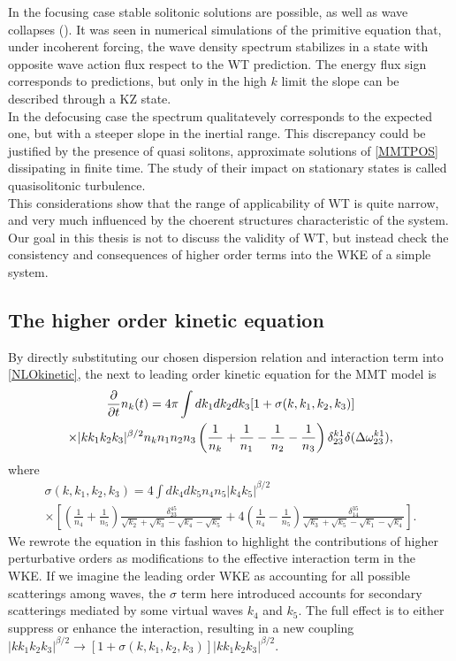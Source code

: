     In the focusing case stable solitonic solutions are possible, as well as wave collapses
    (\cite{Zakharov2001}). It was seen in numerical simulations of the primitive equation that, under incoherent forcing, the wave density spectrum stabilizes in a state
    with opposite wave action flux respect to the WT prediction. The energy flux sign corresponds to predictions, but only in the high $k$ limit the slope can be 
    described through a KZ state.\\
    In the defocusing case the spectrum qualitatevely corresponds to the expected one, but with a steeper slope in the inertial range. This discrepancy could be justified 
    by the presence of quasi solitons, approximate solutions of \eqref{MMTPOS} dissipating in finite time. The study of their impact on stationary states is called 
    quasisolitonic turbulence. \\
    This considerations show that the range of applicability of WT is quite narrow, and very much influenced by the choerent structures characteristic of the system. 
    Our goal in this thesis is not to discuss the validity of WT, but instead check the consistency and consequences of higher order terms into the 
    WKE of a simple system. \\
    \subsection{The higher order kinetic equation}

    By directly substituting our chosen dispersion relation and interaction term into \eqref{NLOkinetic}, the next to leading order kinetic equation for the MMT 
    model is 
    \begin{multline}
        \frac{\partial}{\partial t}n_k(t) = 4\pi \int dk_1dk_2dk_3[1 + \sigma(k,k_1,k_2,k_3)]\\
        \times |kk_1k_2k_3|^{\beta/2} n_kn_1n_2n_3 \left(\frac{1}{n_k} +\frac{1}{n_1}-
        \frac{1}{n_2}-\frac{1}{n_3}\right)\delta_{23}^{k1}\delta(\Delta{\omega}^{k1}_{23}), 
        \label{wke_nlo}
    \end{multline}
    where 
    \begin{multline}
        \sigma(k,k_1,k_2,k_3) =  4 \int dk_4dk_5n_4n_5|k_4k_5|^{\beta/2} \\
        \times \left[\left( \frac{1}{n_4}+\frac{1}{n_5} \right) 
        \frac{\delta_{23}^{45}}{\sqrt{k_2}+\sqrt{k_3}-\sqrt{k_4}-\sqrt{k_5}} + 4\left( \frac{1}{n_4}-\frac{1}{n_5} \right) 
        \frac{\delta_{14}^{35}}{\sqrt{k_3}+\sqrt{k_5}-\sqrt{k_1}-\sqrt{k_4}}\right].
        \label{sigma}
    \end{multline}
    We rewrote the equation in this fashion to highlight the contributions of higher perturbative orders as modifications to the effective interaction term in the WKE.
    If we imagine the leading order WKE as accounting for all possible scatterings among waves, the $\sigma$ term here introduced accounts for secondary scatterings 
    mediated by some virtual waves $k_4$ and $k_5$. The full effect is to either suppress or enhance the interaction, resulting in a new coupling 
    $|kk_1k_2k_3|^{\beta/2} \longrightarrow [1 + \sigma(k,k_1,k_2,k_3)]|kk_1k_2k_3|^{\beta/2} $. \\

